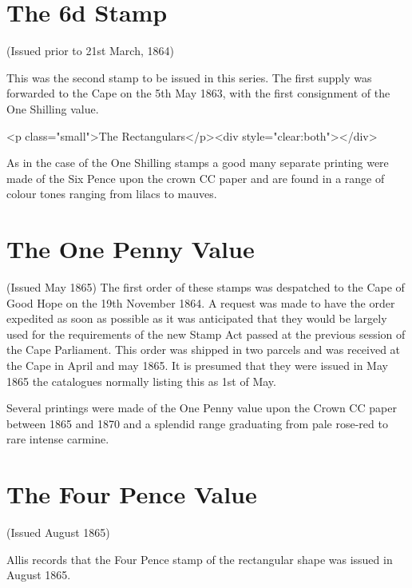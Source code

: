  
\section{The 6d Stamp}
(Issued prior to 21st March, 1864)

This was the second stamp to be issued in this series. The first supply
was forwarded to the Cape on the 5th May 1863, with the first consignment
of the One Shilling value.

<p class="small">The Rectangulars</p><div style="clear:both"></div>

As in the case of the One Shilling stamps a good many separate 
printing were made of the Six Pence upon the crown CC paper 
and are found in a range of colour tones ranging from lilacs to mauves.


\section{The One Penny Value}
(Issued May 1865)
The first order of these stamps was despatched to the Cape of 
Good Hope on the 19th November 1864. A request was made to 
have the order expedited as soon as possible as it was 
anticipated that they would be largely used for the requirements 
of the new Stamp Act passed at the previous session of the 
Cape Parliament. This order was shipped in two parcels and was 
received at the Cape in April and may 1865. It is presumed that 
they were issued in May 1865 the catalogues normally listing 
this as 1st of May.


Several printings were made of the One Penny value upon the Crown CC 
paper between 1865 and 1870 and a splendid range graduating from 
pale rose-red to rare intense carmine.

\section{The Four Pence Value}
(Issued August 1865)


 
Allis records that the Four Pence stamp of the rectangular shape 
was issued in August 1865.

